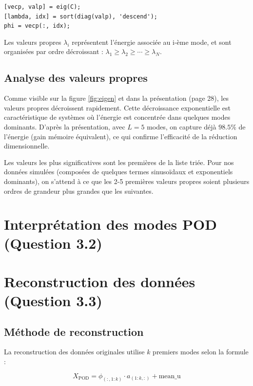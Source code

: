 \documentclass{rapportECL}
\begin{document}
\begin{lstlisting}[caption={Calcul des modes POD}, label=code:eig]
[vecp, valp] = eig(C);
[lambda, idx] = sort(diag(valp), 'descend');
phi = vecp(:, idx);
\end{lstlisting}

Les valeurs propres \( \lambda_i \) représentent l'énergie associée au i-ème mode, et sont organisées par ordre décroissant : \( \lambda_1 \geq \lambda_2 \geq \cdots \geq \lambda_N \).

\subsection{Analyse des valeurs propres}
Comme visible sur la figure \ref{fig:eigen} et dans la présentation (page 28), les valeurs propres décroissent rapidement. Cette décroissance exponentielle est caractéristique de systèmes où l'énergie est concentrée dans quelques modes dominants. D'après la présentation, avec \( L=5 \) modes, on capture déjà \( 98.5\% \) de l'énergie (gain mémoire équivalent), ce qui confirme l'efficacité de la réduction dimensionnelle.

Les valeurs les plus significatives sont les premières de la liste triée. Pour nos données simulées (composées de quelques termes sinusoïdaux et exponentiels dominants), on s'attend à ce que les 2-5 premières valeurs propres soient plusieurs ordres de grandeur plus grandes que les suivantes.


\section{Interprétation des modes POD (Question 3.2)}


\section{Reconstruction des données (Question 3.3)}

\subsection{Méthode de reconstruction}
La reconstruction des données originales utilise \( k \) premiers modes selon la formule :

\[
X_{\text{POD}} = \phi_{(:,1:k)} \cdot a_{(1:k,:)} + \text{mean\_u}
\]
\end{document}
